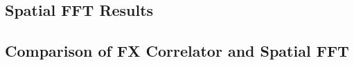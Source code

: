 \documentclass[useAMS,macros,usenatbib,onecolumn]{mn2e}
\begin{document}
%
%
%

\subsection{Spatial FFT Results}
\label{sfft results}


\subsection{Comparison of FX Correlator and Spatial FFT}

\end{document}

